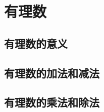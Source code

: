 \chapter{有理数}

\section{有理数的意义}\label{sec:1-1}








\section{有理数的加法和减法}\label{sec:1-2}








\section{有理数的乘法和除法}\label{sec:1-3}




